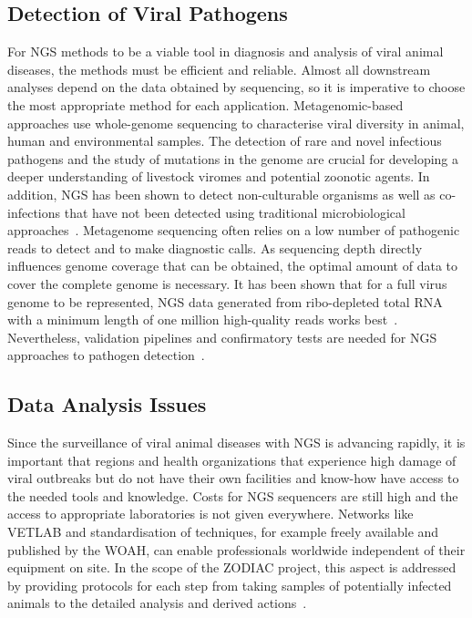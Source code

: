 \subsection{Detection of Viral Pathogens}
For NGS methods to be a viable tool in diagnosis and analysis of viral animal diseases, the methods must be efficient and reliable. Almost all downstream analyses depend on the data obtained by sequencing, so it is imperative to choose the most appropriate method for each application. Metagenomic-based approaches use whole-genome sequencing to characterise viral diversity in animal, human and environmental samples. The detection of rare and novel infectious pathogens and the study of mutations in the genome are crucial for developing a deeper understanding of livestock viromes and potential zoonotic agents. In addition, NGS has been shown to detect non-culturable organisms as well as co-infections that have not been detected using traditional microbiological approaches~\cite{cantalupo2019detecting}. Metagenome sequencing often relies on a low number of pathogenic reads to detect and to make diagnostic calls. As sequencing depth directly influences genome coverage that can be obtained, the optimal amount of data to cover the complete genome is necessary. It has been shown that for a full virus genome to be represented, NGS data generated from ribo-depleted total RNA with a minimum length of one million high-quality reads works best~\cite{visser2016next}. Nevertheless, validation pipelines and confirmatory tests are needed for NGS approaches to pathogen detection~\cite{minogue2019next}.

\subsection{Data Analysis Issues}
Since the surveillance of viral animal diseases with NGS is advancing rapidly, it is important that regions and health organizations that experience high damage of viral outbreaks but do not have their own facilities and know-how have access to the needed tools and knowledge. Costs for NGS sequencers are still high and the access to appropriate laboratories is not given everywhere. Networks like VETLAB and standardisation of techniques, for example freely available and published by the WOAH, can enable professionals worldwide independent of their equipment on site. In the scope of the ZODIAC project, this aspect is addressed by providing protocols for each step from taking samples of potentially infected animals to the detailed analysis and derived actions~\cite{zodiac2021}.

